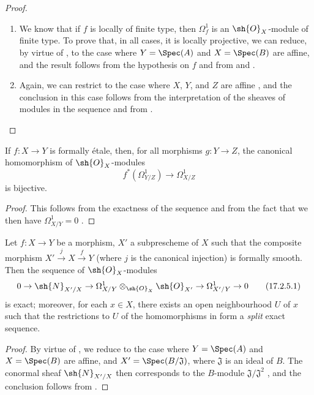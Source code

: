 \begin{proof}
\medskip\noindent
\begin{enumerate}
  \item[(i)] We know  that if $f$ is locally of finite type, then $\Omega_f^1$ is an $\sh{O}_X$-module of finite type. 
    To prove that, in all cases, it is locally projective, we can reduce, by virtue of , to the case where $Y=\Spec(A)$ and $X=\Spec(B)$ are affine, and the result follows from the hypothesis on $f$ and from  and .
  \item[(ii)] Again, we can restrict to the case where $X$, $Y$, and $Z$ are affine , and the conclusion in this case follows from the interpretation of the sheaves of modules in the sequence  and from .
\end{enumerate}
\end{proof}

\begin{corollary}[17.2.4]
\label{IV.17.2.4}
If $f:X\to Y$ is formally \'etale, then, for all morphisms $g:Y\to Z$, the canonical homomorphism of $\sh{O}_X$-modules
\[
  f^*(\Omega_{Y/Z}^1)\to\Omega_{X/Z}^1
\]
is bijective.
\end{corollary}

\begin{proof}
This follows from the exactness of the sequence  and from the fact that we then have $\Omega_{X/Y}^1=0$ .
\end{proof}

\begin{proposition}[17.2.5]
\label{IV.17.2.5}
Let $f:X\to Y$ be a morphism, $X'$ a subprescheme of $X$ such that the composite morphism $X'\xrightarrow{j}X\xrightarrow{f}Y$ (where $j$ is the canonical injection) is formally smooth.
Then the sequence of $\sh{O}_X$-modules 
\[
\label{IV.17.2.5.1}
  0\to\sh{N}_{X'/X}\to\Omega_{X/Y}^1\otimes_{\sh{O}_X}\sh{O}_{X'}\to\Omega_{X'/Y}^1\to 0
\tag{17.2.5.1}
\]
is exact; moreover, for each $x\in X$, there exists an open neighbourhood $U$ of $x$ such that the restrictions to $U$ of the homomorphisms in  form a \emph{split} exact sequence.
\end{proposition}

\begin{proof}
By virtue of , we reduce to the case where $Y=\Spec(A)$ and $X=\Spec(B)$ are affine, and $X'=\Spec(B/\mathfrak{J})$, where $\mathfrak{J}$ is an ideal of $B$. 
The conormal sheaf $\sh{N}_{X'/X}$ then corresponds to the $B$-module $\mathfrak{J}/\mathfrak{J}^2$ , and the conclusion follows from .
\end{proof}

